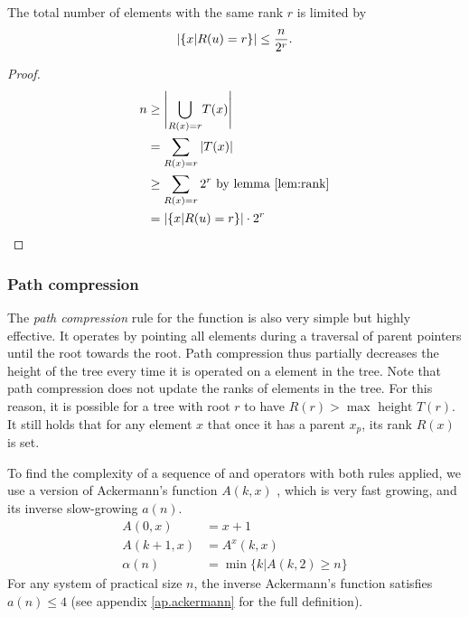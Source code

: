 \begin{lemma}\label{lem:noderank}
  The total number of elements with the same rank $r$ is limited by 
  \begin{equation}
      \abs{\{x | R(u)=r \}} \leq \frac{n}{2^r}.
  \end{equation}
\end{lemma}
\begin{proof}
    \begin{align*}
        n &\geq \Bigg| \underset{R(x)=r}{\bigcup} T(x) \Bigg| \\
        &= \sum_{R(x)=r} \abs{T(x)} \\
        &\geq \sum_{R(x)=r} 2^r \text{ by lemma \ref{lem:rank}}\\
        &= \abs{\{x | R(u)=r\}}\cdot 2^r
    \end{align*}
\end{proof}

\subsubsection{Path compression}
The \emph{path compression} rule for the  function is also very simple but highly effective. It operates by pointing all elements during a traversal of parent pointers until the root towards the root. Path compression thus partially decreases the height of the tree every time it is operated on a element in the tree. Note that path compression does not update the ranks of elements in the tree. For this reason, it is possible for a tree with root $r$ to have $R(r) > \max \text{ height } T(r)$. It still holds that for any element $x$ that once it has a parent $x_p$, its rank $R(x)$ is set. 

To find the complexity of a sequence of  and  operators with both rules applied, we use a version of Ackermann's function $A(k,x)$ \cite{ackermann1928hilbertschen, kozen1992design}, which is very fast growing, and its inverse slow-growing $a(n)$. 
\begin{align}
  \nonumber A(0,x) &= x + 1\\
  A(k+1,x) &= A^x(k,x) \\
  \nonumber \alpha(n) &= \min\{k | A(k,2) \geq n \}
\end{align}
For any system of practical size $n$, the inverse Ackermann's function satisfies $a(n)\leq 4$ (see appendix \ref{ap.ackermann} for the full definition). 

